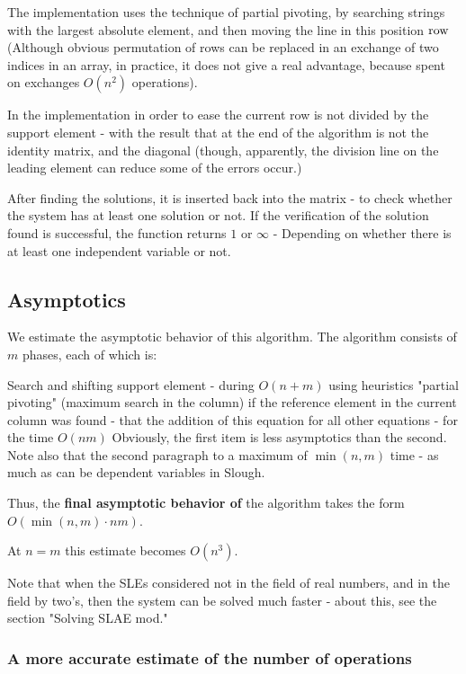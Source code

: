The implementation uses the technique of partial pivoting, by searching strings with the largest absolute element, and then moving the line in this position $\rm row$ (Although obvious permutation of rows can be replaced in an exchange of two indices in an array, in practice, it does not give a real advantage, because spent on exchanges $O (n ^ 2)$ operations).

In the implementation in order to ease the current row is not divided by the support element - with the result that at the end of the algorithm is not the identity matrix, and the diagonal (though, apparently, the division line on the leading element can reduce some of the errors occur.)

After finding the solutions, it is inserted back into the matrix - to check whether the system has at least one solution or not. If the verification of the solution found is successful, the function returns $1$ or $\infty$ - Depending on whether there is at least one independent variable or not.

\subsection{ Asymptotics }

We estimate the asymptotic behavior of this algorithm. The algorithm consists of $m$ phases, each of which is:

Search and shifting support element - during $O (n + m)$ using heuristics "partial pivoting" (maximum search in the column)
if the reference element in the current column was found - that the addition of this equation for all other equations - for the time $O (nm)$
Obviously, the first item is less asymptotics than the second. Note also that the second paragraph to a maximum of $\min (n, m)$ time - as much as can be dependent variables in Slough.

Thus, the \textbf{final asymptotic behavior of} the algorithm takes the form $O (\min (n, m) \cdot n m)$.

At $n = m$ this estimate becomes $O (n ^ 3)$.

Note that when the SLEs considered not in the field of real numbers, and in the field by two's, then the system can be solved much faster - about this, see the section "Solving SLAE mod."

\subsubsection{ A more accurate estimate of the number of operations }

